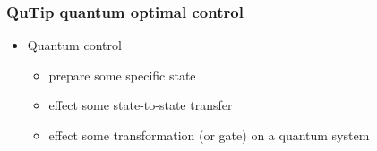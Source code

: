 \documentclass{article}
\begin{document}
\subsubsection{QuTip quantum optimal control}
\begin{itemize}
    \item Quantum control
        \begin{itemize}
            \item prepare some specific state
            \item effect some state-to-state transfer
            \item effect some transformation (or gate) on a quantum system
        \end{itemize} 
\end{itemize}

\end{document}
